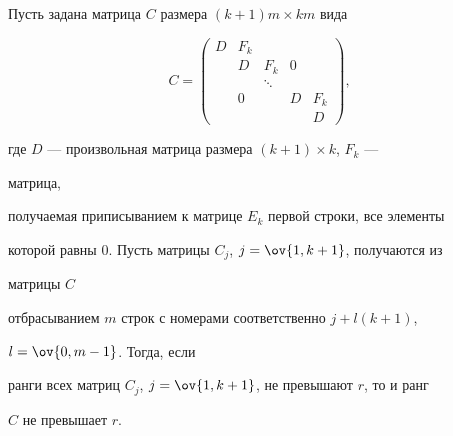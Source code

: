 \begin{lem} 


Пусть задана матрица $C$ размера $(k+1)m\times k m$ вида 


$$ 


C= 


\begin{pmatrix} 


D & F_k & \ & \ & \ \\ 


\ & D & F_k & 0 & \ \\ 


\ & \ & \ddots & \ & \ \\ 


\ & 0 & \ & D & F_k \\ 


\ & \ & \ & \ & D 


\end{pmatrix} 


, 


$$ 


где $D$ --- произвольная матрица размера $(k+1)\times k$, $F_k$ --- 


матрица, 


получаемая приписыванием к матрице $E_k$ первой строки, все элементы 


которой равны $0$. Пусть матрицы $C_j$, $j=\ov{1,k+1}$, получаются из 


матрицы $C$ 


отбрасыванием $m$ строк с номерами соответственно $j+l(k+1)$, 


$l=\ov{0,m-1}$. Тогда, если 


ранги всех матриц $C_j$, $j=\ov{1,k+1}$, не превышают $r$, то и ранг 


$C$ не превышает $r$. 


\end{lem} 


 


